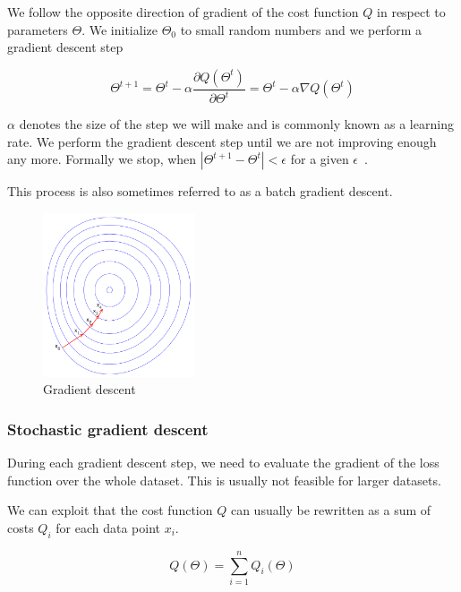     We follow the opposite direction of gradient of the cost function $Q$ in respect to parameters $\Theta$. 
    We initialize $\Theta_0$ to small random numbers and we perform a gradient descent step
    
    \begin{equation}
      \Theta^{t+1} = \Theta^t - \alpha \frac{\partial Q(\Theta^t)}{\partial \Theta^t} = \Theta^t - \alpha \nabla Q(\Theta^t)
      \label{eq:gradient:descent}
    \end{equation}

    $\alpha$ denotes the size of the step we will make and is commonly known as a learning rate. 
    We perform the gradient descent step until we are not improving enough any more. 
    Formally we stop, when $|\Theta^{t+1} - \Theta^t| < \epsilon$ for a given $\epsilon$~\cite{bottou-bousquet-2008}.
    
    This process is also sometimes referred to as a batch gradient descent.

    \begin{figure}
    \centerline{\includegraphics[width=0.4\textwidth]{images/gradient_descent}}
    \caption[Gradient descent]{Gradient descent~\cite{pict}}
    \label{obr:gradient}
    \end{figure}
    
    \subsubsection{Stochastic gradient descent}
    
    During each gradient descent step, we need to evaluate the gradient of the loss function over the whole dataset.
    This is usually not feasible for larger datasets. 
    
    We can exploit that the cost function $Q$ can usually be rewritten as a sum of costs $Q_i$ for each data point $x_i$.
    
    $$Q(\Theta) = \sum_{i=1}^n Q_i(\Theta)$$
    
